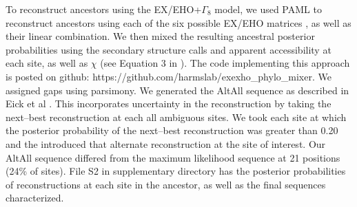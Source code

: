 To reconstruct ancestors using the EX/EHO+$\Gamma_{8}$ model, we
used PAML to reconstruct ancestors using each of the six possible
EX/EHO matrices \citep{yang_new_1995,yang_paml_2007}, as well as
their linear combination. We then mixed the resulting ancestral posterior
probabilities using the secondary structure calls and apparent accessibility
at each site, as well as $\chi$ (see Equation 3 in \citep{le_accounting_2010}).
The code implementing this approach is posted on github: https://github.com/harmslab/exexho\_phylo\_mixer.
We assigned gaps using parsimony. We generated the AltAll sequence
as described in Eick et al \citep{eick_robustness_2017}. This incorporates
uncertainty in the reconstruction by taking the next--best reconstruction
at each all ambiguous sites. We took each site at which the posterior
probability of the next--best reconstruction was greater than 0.20
and the introduced that alternate reconstruction at the site of interest.
Our AltAll sequence differed from the maximum likelihood sequence
at 21 positions (24\% of sites). File S2 in supplementary directory has the posterior probabilities
of reconstructions at each site in the ancestor, as well as the final
sequences characterized. 

